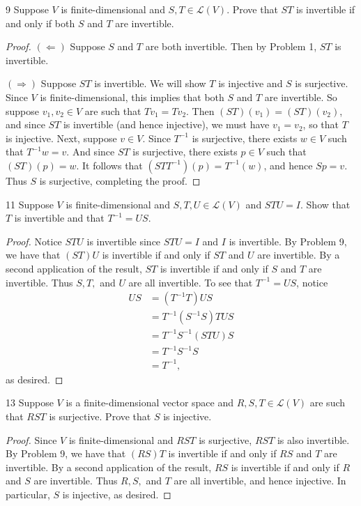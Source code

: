 \documentclass{extarticle}
\newenvironment{problem}[1]{\begin{prob*}{#1}{}}{\end{prob*}}
\newcommand{\Hom}{\mathcal{L}}
\begin{document}
\begin{problem}{9}
Suppose $V$ is finite-dimensional and $S,T\in\Hom(V)$.  Prove that $ST$ is invertible if and only if both $S$ and $T$ are invertible.  
\end{problem}
\begin{proof}
$(\Leftarrow)$  Suppose $S$ and $T$ are both invertible.  Then by Problem 1, $ST$ is invertible.
\par $(\Rightarrow)$  Suppose $ST$ is invertible.  We will show $T$ is injective and $S$ is surjective.  Since $V$ is finite-dimensional, this implies that both $S$ and $T$ are invertible.  So suppose $v_1,v_2\in V$ are such that $Tv_1 = Tv_2$.  Then $(ST)(v_1) = (ST)(v_2)$, and since $ST$ is invertible (and hence injective), we must have $v_1 = v_2$, so that $T$ is injective.  Next, suppose $v\in V$.  Since $T^{-1}$ is surjective, there exists $w\in V$ such that $T^{-1}w = v$.  And since $ST$ is surjective, there exists $p\in V$ such that $(ST)(p) = w$.  It follows that $(STT^{-1})(p) = T^{-1}(w)$, and hence $Sp = v$.  Thus $S$ is surjective, completing the proof.
\end{proof}

\begin{problem}{11}
Suppose $V$ is finite-dimensional and $S,T,U\in\Hom(V)$ and $STU = I$.  Show that $T$ is invertible and that $T^{-1}=US$.
\end{problem}
\begin{proof}
Notice $STU$ is invertible since $STU=I$ and $I$ is invertible.  By Problem 9, we have that $(ST)U$ is invertible if and only if $ST$ and $U$ are invertible.  By a second application of the result, $ST$ is invertible if and only if $S$ and $T$ are invertible.  Thus $S,T,$ and $U$ are all invertible.  To see that $T^{-1}=US$, notice
\begin{align*}
US &= (T^{-1}T)US\\
&= T^{-1}(S^{-1}S)TUS\\
&= T^{-1}S^{-1}(STU)S\\
&= T^{-1}S^{-1}S\\
&= T^{-1},
\end{align*}
as desired.
\end{proof}

\begin{problem}{13}
Suppose $V$ is a finite-dimensional vector space and $R,S,T\in\Hom(V)$ are such that $RST$ is surjective.  Prove that $S$ is injective.
\end{problem}
\begin{proof}
Since $V$ is finite-dimensional and $RST$ is surjective, $RST$ is also invertible.  By Problem 9, we have that $(RS)T$ is invertible if and only if $RS$ and $T$ are invertible.  By a second application of the result, $RS$ is invertible if and only if $R$ and $S$ are invertible.  Thus $R,S,$ and $T$ are all invertible, and hence injective.  In particular, $S$ is injective, as desired.
\end{proof}
\end{document}
